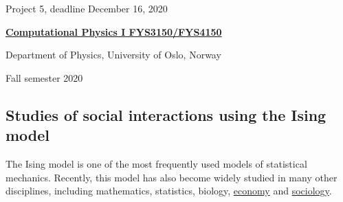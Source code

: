 \documentclass[%
oneside,                 %
final,                   %
10pt]{article}
\begin{document}

\newcommand{\exercisesection}[1]{\subsection*{#1}}






\thispagestyle{empty}

\begin{center}
{\LARGE\bf
\begin{spacing}{1.25}
Project 5, deadline  December 16, 2020
\end{spacing}
}
\end{center}


\begin{center}
{\bf \href{{http://www.uio.no/studier/emner/matnat/fys/FYS3150/index-eng.html}}{Computational Physics I FYS3150/FYS4150}}
\end{center}

    \begin{center}
\centerline{{\small Department of Physics, University of Oslo, Norway}}
\end{center}
    

\begin{center}
Fall semester 2020
\end{center}

\vspace{1cm}


\subsection*{Studies of social interactions using the Ising model}

The Ising model is one of the most
frequently used models of statistical mechanics. Recently, this
model has also become widely studied in many other disciplines, including mathematics, statistics, biology, \href{{https://www.springer.com/gp/book/9783319477046}}{economy} and \href{{https://www.springer.com/gp/book/9781461420316}}{sociology}.
\end{document}
